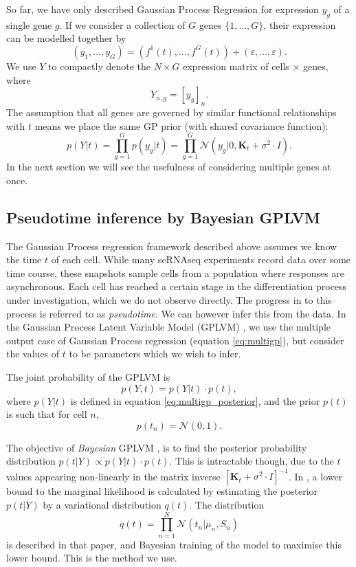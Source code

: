 So far, we have only described Gaussian Process Regression for expression $ y_g $ of a single gene $ g $. If we consider a collection of $ G $ genes $ \{1, \ldots, G\} $, their expression can be modelled together by
\begin{equation}
\label{eq:multigp}
(y_{1}, \ldots, y_{G}) = (f^{1}(t), \ldots, f^{G}(t)) + (\varepsilon, \ldots, \varepsilon).
\end{equation}
We use $ Y $ to compactly denote the $ N \times G $ expression matrix of cells $ \times $ genes, where
\[ Y_{n, g} = [y_{g}]_n. \]
The assumption that all genes are governed by similar functional relationships with $ t $ means we place the same GP prior (with shared covariance function):
\begin{equation}
\label{eq:multigp_posterior}
p(Y | t) = \prod_{g = 1}^G p(y_{g} | t) = \prod_{g = 1}^G \mathcal{N}(y_{g} | 0, \bm{K}_{t} + \sigma^2 \cdot I).
\end{equation}
In the next section we will see the usefulness of considering multiple genes at once.

\subsection{Pseudotime inference by Bayesian GPLVM}

The Gaussian Process regression framework described above assumes we know the time $ t $ of each cell. While many scRNAseq experiments record data over some time course, these snapshots sample cells from a population where responses are asynchronous. Each cell has reached a certain stage in the differentiation process under investigation, which we do not observe directly. The progress in to this process is referred to as \textit{pseudotime}. We can however infer this from the data. In the Gaussian Process Latent Variable Model (GPLVM) \cite{Lawrence2006-it}, we use the multiple output case of Gaussian Process regression (equation \ref{eq:multigp}), but consider the values of $ t $ to be parameters which we wish to infer.

The joint probability of the GPLVM is
\[ p(Y, t) = p(Y | t) \cdot p(t), \]
where $ p(Y | t) $ is defined in equation \ref{eq:multigp_posterior}, and the prior $ p(t) $ is such that for cell $ n $,
\[ p(t_n) = \mathcal{N}(0, 1). \]

The objective of \textit{Bayesian} GPLVM \cite{Titsias2010-hq}, is to find the posterior probability distribution $ p(t | Y) \propto p(Y | t) \cdot p(t) $. This is intractable though, due to the $ t $ values appearing non-linearly in the matrix inverse $ [\bm{K}_t + \sigma^2 \cdot I]^{-1} $. In \cite{Titsias2010-hq}, a lower bound to the marginal likelihood is calculated by estimating the  posterior $ p(t | Y) $ by a variational distribution $ q(t). $ The distribution
\[ q(t) = \prod_{n=1}^N \mathcal{N} (t_n | \mu_n, S_n ) \]
is described in that paper, and Bayesian training of the model to maximise this lower bound. This is the method we use.

